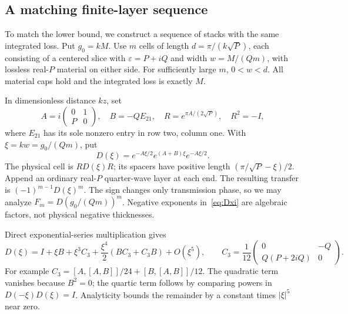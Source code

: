 \documentclass[11pt,a4paper]{article}
\theoremstyle{remark}
\newcommand{\abs}[1]{\lvert #1\rvert}
\begin{document}
\subsection{A matching finite-layer sequence}
To match the lower bound, we construct a sequence of stacks with the same integrated loss. Put $g_0=kM$. Use $m$ cells of length $d=\pi/(k\sqrt P)$, each consisting of a centered slice with $\varepsilon=P+iQ$ and width $w=M/(Qm)$, with lossless real-$P$ material on either side. For sufficiently large $m$, $0<w<d$. All material caps hold and the integrated loss is exactly $M$.

In dimensionless distance $kz$, set
\[
 A=i\begin{pmatrix}0&1\\P&0\end{pmatrix},\quad B=-QE_{21},\quad
 R=e^{\pi A/(2\sqrt P)},\quad R^2=-I,
\]
where $E_{21}$ has its sole nonzero entry in row two, column one. With $\xi=kw=g_0/(Qm)$, put
\begin{equation}\label{eq:Dxi}
 D(\xi)=e^{-A\xi/2}e^{(A+B)\xi}e^{-A\xi/2}.
\end{equation}
The physical cell is $RD(\xi)R$; its spacers have positive length $(\pi/\sqrt P-\xi)/2$. Append an ordinary real-$P$ quarter-wave layer at each end. The resulting transfer is $(-1)^{m-1}D(\xi)^m$. The sign changes only transmission phase, so we may analyze $F_m=D(g_0/(Qm))^m$. Negative exponents in~\eqref{eq:Dxi} are algebraic factors, not physical negative thicknesses.

Direct exponential-series multiplication gives
\begin{equation}\label{eq:product-expansion}
 D(\xi)=I+\xi B+\xi^3C_3+\frac{\xi^4}{2}(BC_3+C_3B)+O(\xi^5),\qquad
 C_3=\frac1{12}\begin{pmatrix}0&-Q\\Q(P+2iQ)&0\end{pmatrix}.
\end{equation}
For example $C_3=[A,[A,B]]/24+[B,[A,B]]/12$. The quadratic term vanishes because $B^2=0$; the quartic term follows by comparing powers in $D(-\xi)D(\xi)=I$. Analyticity bounds the remainder by a constant times $\abs\xi^5$ near zero.
\end{document}
